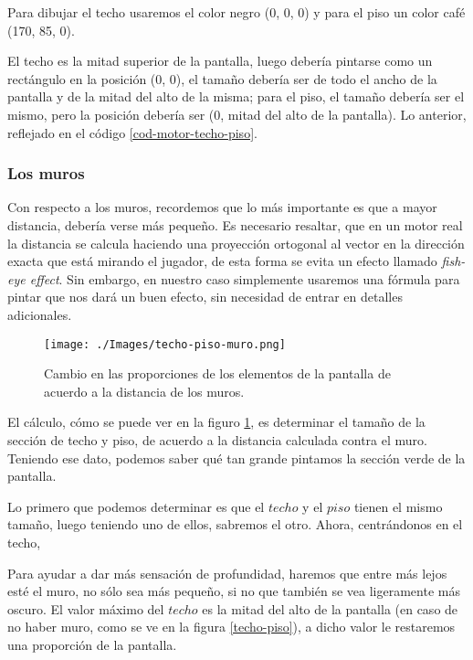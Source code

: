 Para dibujar el techo usaremos el color negro (0, 0, 0) y para el piso un color café (170, 85, 0). 

El techo es la mitad superior de la pantalla, luego debería pintarse como un rectángulo en la posición (0, 0), el tamaño debería ser de todo el ancho de la pantalla y de la mitad del alto de la misma; para el piso, el tamaño debería ser el mismo, pero la posición debería ser (0, mitad del alto de la pantalla). Lo anterior, reflejado en el código \ref{cod-motor-techo-piso}.

\newpage



\subsubsection{Los muros}

Con respecto a los muros, recordemos que lo más importante es que a mayor distancia, debería verse más pequeño. Es necesario resaltar, que en un motor real la distancia se calcula haciendo una proyección ortogonal al vector en la dirección exacta que está mirando el jugador, de esta forma se evita un efecto llamado \emph{fish-eye effect}. Sin embargo, en nuestro caso simplemente usaremos una fórmula para pintar que nos dará un buen efecto, sin necesidad de entrar en detalles adicionales.

\begin{figure}[h!]
	\centering
	\texttt{[image: ./Images/techo-piso-muro.png]}
	\caption{Cambio en las proporciones de los elementos de la pantalla de acuerdo a la distancia de los muros.}
	\label{techo-piso-muro}
\end{figure}

El cálculo, cómo se puede ver en la figuro \ref{techo-piso-muro}, es determinar el tamaño de la sección de techo y piso, de acuerdo a la distancia calculada contra el muro. Teniendo ese dato, podemos saber qué tan grande pintamos la sección verde de la pantalla.

Lo primero que podemos determinar es que el $techo$ y el $piso$ tienen el mismo tamaño, luego teniendo uno de ellos, sabremos el otro. Ahora, centrándonos en el techo, 


Para ayudar a dar más sensación de profundidad, haremos que entre más lejos esté el muro, no sólo sea más pequeño, si no que también se vea ligeramente más oscuro. El valor máximo del $techo$ es la mitad del alto de la pantalla (en caso de no haber muro, como se ve en la figura \ref{techo-piso}), a dicho valor le restaremos una proporción de la pantalla.

